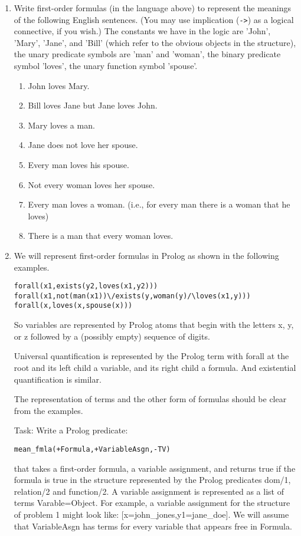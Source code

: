 \begin{enumerate}
\begin{enumerate}
\item
Write first-order formulas (in the language above) to represent the
meanings of the following English sentences.  (You may use implication
(\verb|->|) as a logical connective, if you wish.)  The constants we
have in the logic are 'John', 'Mary', 'Jane', and 'Bill' (which refer
to the obvious objects in the structure), the unary predicate symbols
are 'man' and 'woman', the binary predicate symbol 'loves', the unary
function symbol 'spouse'.

\begin{enumerate}
\item
John loves Mary.
\item
Bill loves Jane but Jane loves John.
\item
Mary loves a man.
\item
Jane does not love her spouse.
\item
Every man loves his spouse.
\item
Not every woman loves her spouse.
\item
Every man loves a woman.  (i.e., for every man there is a woman that he loves)
\item
There is a man that every woman loves.
\end{enumerate}

\item
We will represent first-order formulas in Prolog as shown in the
following examples.

\begin{verbatim}
forall(x1,exists(y2,loves(x1,y2)))
forall(x1,not(man(x1))\/exists(y,woman(y)/\loves(x1,y)))
forall(x,loves(x,spouse(x)))
\end{verbatim}

So variables are represented by Prolog atoms that begin with the letters
x, y, or z followed by a (possibly empty) sequence of digits.

Universal quantification is represented by the Prolog term with forall
at the root and its left child a variable, and its right child a
formula.  And existential quantification is similar.

The representation of terms and the other form of formulas should be
clear from the examples.

Task: Write a Prolog predicate: 
\begin{verbatim}
mean_fmla(+Formula,+VariableAsgn,-TV)
\end{verbatim}
that takes a first-order formula, a variable assignment, and returns
true if the formula is true in the structure represented by the Prolog
predicates dom/1, relation/2 and function/2.  A variable assignment is
represented as a list of terms Varable=Object.  For example, a
variable assignment for the structure of problem 1 might look like:
[x=john\_jones,y1=jane\_doe].  We will assume that VariableAsgn has
terms for every variable that appears free in Formula.


\end{enumerate}
\end{enumerate}
